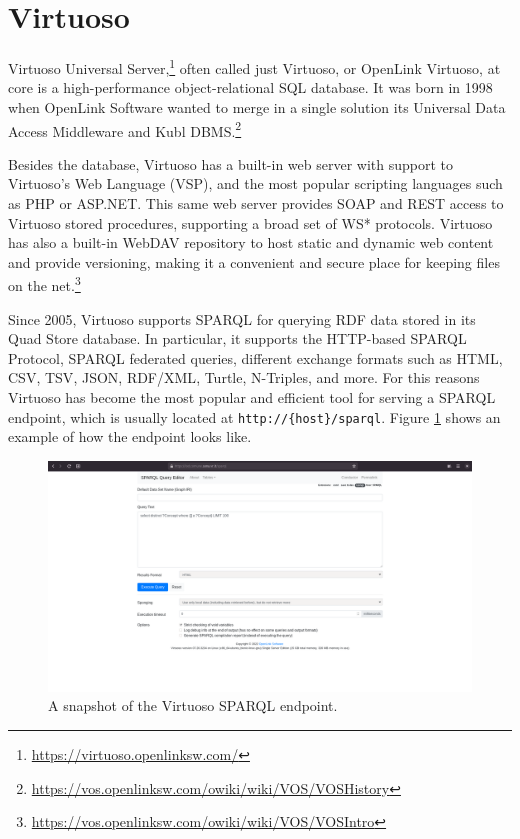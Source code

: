\section{Virtuoso}
\label{sec:virtuoso}

Virtuoso Universal Server,\footnote{\url{https://virtuoso.openlinksw.com/}} often called just Virtuoso, or OpenLink Virtuoso, at core is a high-performance object-relational \acs{SQL} database. It was born in 1998 when OpenLink Software wanted to merge in a single solution its Universal Data Access Middleware and Kubl \acs{DBMS}.\footnote{\url{https://vos.openlinksw.com/owiki/wiki/VOS/VOSHistory}}

Besides the database, Virtuoso has a built-in web server with support to Virtuoso's Web Language (VSP), and the most popular scripting languages such as PHP or ASP.NET. This same web server provides SOAP and REST access to Virtuoso stored procedures, supporting a broad set of WS* protocols.
Virtuoso has also a built-in WebDAV repository to host static and dynamic web content and provide versioning, making it a convenient and secure place for keeping files on the net.\footnote{\url{https://vos.openlinksw.com/owiki/wiki/VOS/VOSIntro}}

Since 2005, Virtuoso supports \ac{SPARQL} for querying \ac{RDF} data stored in its Quad Store database. In particular, it supports the \ac{HTTP}-based \ac{SPARQL} Protocol, \ac{SPARQL} federated queries, different exchange formats such as \acs{HTML}, \ac{CSV}, \ac{TSV}, \ac{JSON}, \ac{RDF}/\ac{XML}, Turtle, N-Triples, and more. For this reasons Virtuoso has become the most popular and efficient tool for serving a \ac{SPARQL} endpoint, which is usually located at \verb#http://{host}/sparql#. Figure \ref{fig:virtuoso-sparql} shows an example of how the endpoint looks like.

\begin{figure}[!ht]
  \centering
  \includegraphics[width=\columnwidth]{images/virtuoso/virtuoso-sparql}
  \caption{A snapshot of the Virtuoso \ac{SPARQL} endpoint.}
  \label{fig:virtuoso-sparql}
\end{figure}

